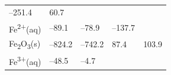 \documentclass[
  9pt,
]{extbook}
\theoremstyle{definition}
\theoremstyle{definition}
\theoremstyle{definition}
\theoremstyle{remark}
\begin{document}
\begin{longtable}[]{@{}lllll@{}}
\begin{minipage}[t]{0.20\columnwidth}
--251.4\strut
\end{minipage} & \begin{minipage}[t]{0.18\columnwidth}\raggedright
60.7\strut
\end{minipage} & \begin{minipage}[t]{0.18\columnwidth}\raggedright
\strut
\end{minipage}\tabularnewline
\begin{minipage}[t]{0.10\columnwidth}\raggedright
Fe\textsuperscript{2+}(aq)\strut
\end{minipage} & \begin{minipage}[t]{0.19\columnwidth}\raggedright
--89.1\strut
\end{minipage} & \begin{minipage}[t]{0.20\columnwidth}\raggedright
--78.9\strut
\end{minipage} & \begin{minipage}[t]{0.18\columnwidth}\raggedright
--137.7 \textbar{}\strut
\end{minipage} & \begin{minipage}[t]{0.18\columnwidth}\raggedright
\strut
\end{minipage}\tabularnewline
\begin{minipage}[t]{0.10\columnwidth}\raggedright
Fe\textsubscript{2}O\textsubscript{3}(s)\strut
\end{minipage} & \begin{minipage}[t]{0.19\columnwidth}\raggedright
--824.2\strut
\end{minipage} & \begin{minipage}[t]{0.20\columnwidth}\raggedright
--742.2\strut
\end{minipage} & \begin{minipage}[t]{0.18\columnwidth}\raggedright
87.4\strut
\end{minipage} & \begin{minipage}[t]{0.18\columnwidth}\raggedright
103.9\strut
\end{minipage}\tabularnewline
\begin{minipage}[t]{0.10\columnwidth}\raggedright
Fe\textsuperscript{3+}(aq)\strut
\end{minipage} & \begin{minipage}[t]{0.19\columnwidth}\raggedright
--48.5\strut
\end{minipage} & \begin{minipage}[t]{0.20\columnwidth}\raggedright
--4.7\strut
\end{minipage} & \begin{minipage}[t]{0.18\columnwidth}\raggedright

\end{minipage}
\end{longtable}
\end{document}
